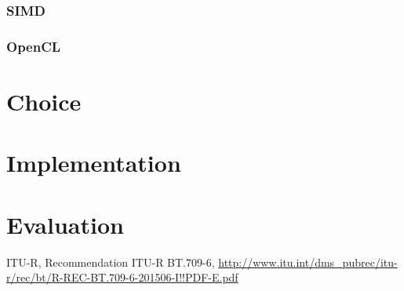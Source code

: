 \documentclass[a4paper]{article}
\begin{document}
\subsubsection{SIMD}

\subsubsection{OpenCL}

\section{Choice}

\section{Implementation}

\section{Evaluation}

\begin{thebibliography}{9}

  ITU-R,
  Recommendation  ITU-R  BT.709-6,
  \url{http://www.itu.int/dms_pubrec/itu-r/rec/bt/R-REC-BT.709-6-201506-I!!PDF-E.pdf}

\end{thebibliography}
\end{document}
